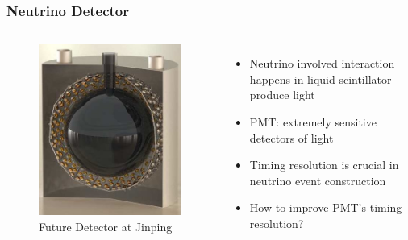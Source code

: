 \documentclass{beamer}
\begin{document}
\begin{frame}
\frametitle{Neutrino Detector}
\begin{columns}
\begin{figure}
    \centering
    \caption{Future Detector at Jinping}
    \includegraphics[width=1.0\linewidth]{img/DetectoratJinping.jpg}
\end{figure}
\begin{itemize}
    \item Neutrino involved interaction happens in liquid scintillator produce light
    \item PMT: extremely sensitive detectors of light
    \item Timing resolution is crucial in neutrino event construction
    \item How to improve PMT's timing resolution? 
\end{itemize}
\end{columns}
\end{frame}
\end{document}
